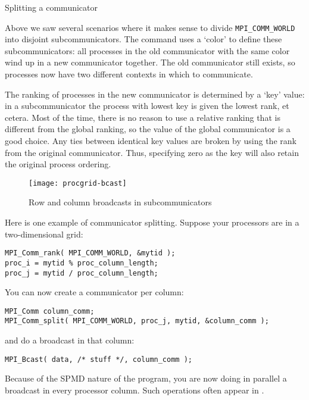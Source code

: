 
 {Splitting a communicator}
\label{sec:comm-split}

Above we saw several scenarios where it makes sense to divide
\lstinline{MPI_COMM_WORLD} into disjoint subcommunicators.
The command  uses a `color' to define
these subcommunicators:
all processes in the old communicator with the same color
wind up in a new communicator together. The old communicator still exists,
so processes now have two different contexts in which to communicate.

The ranking of processes in the new communicator is determined by a `key' value:
in a subcommunicator the process with lowest key is given the lowest rank, et cetera.
Most of the time, there is no reason to use a relative ranking that is different from
the global ranking, so the  value of the global communicator
is a good choice.
Any ties between identical key values are broken by using the rank from the original
communicator.
Thus, specifying zero as the key will also retain the original process ordering.

\begin{figure}[ht]
  \texttt{[image: procgrid-bcast]}
  \caption{Row and column broadcasts in subcommunicators}
  \label{fig:procgrid-bcast}
\end{figure}

Here is one example of communicator splitting. Suppose your processors
are in a two-dimensional grid:
\begin{lstlisting}
MPI_Comm_rank( MPI_COMM_WORLD, &mytid );
proc_i = mytid % proc_column_length;
proc_j = mytid / proc_column_length;
\end{lstlisting}
You can now create a communicator per column:
\begin{lstlisting}
MPI_Comm column_comm;
MPI_Comm_split( MPI_COMM_WORLD, proc_j, mytid, &column_comm );
\end{lstlisting}
and do a broadcast in that column:
\begin{lstlisting}
MPI_Bcast( data, /* stuff */, column_comm );
\end{lstlisting}
Because of the SPMD nature of the program, you are now doing in parallel
a broadcast in every processor column. Such operations often appear
in .

